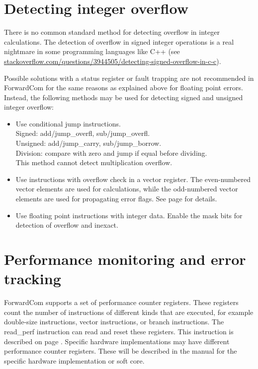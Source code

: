 \documentclass[forwardcom.tex]{subfiles}
\begin{document}
\section{Detecting integer overflow} 
\label{integerOverflowDetection}
There is no common standard method for detecting overflow in integer calculations. The detection of overflow in signed integer operations is a real nightmare in some programming languages like C++ (see 
\href{https://stackoverflow.com/questions/3944505/detecting-signed-overflow-in-c-c}{stackoverflow.com/questions/3944505/detecting-signed-overflow-in-c-c}).
\vv

Possible solutions with a status register or fault trapping are not recommended in ForwardCom for the same reasons as explained above for floating point errors. 
Instead, the following methods may be used for detecting signed and unsigned integer overflow: 

\begin{itemize}
  \item Use conditional jump instructions. \\
    Signed: add/jump\_overfl, sub/jump\_overfl. \\
    Unsigned: add/jump\_carry, sub/jump\_borrow. \\
    Division: compare with zero and jump if equal before dividing. \\
    This method cannot detect multiplication overflow.  
  
  \item Use instructions with overflow check in a vector register. 
    The even-numbered vector elements are used for calculations, while
    the odd-numbered vector elements are used for propagating error flags. 
    See page \pageref{table:addOcInstruction} for details. 
    
  \item Use floating point instructions with integer data. 
    Enable the mask bits for detection of overflow and inexact.
  
\end{itemize}
\vv


\section{Performance monitoring and error tracking}
ForwardCom supports a set of performance counter registers. These registers count the number of instructions of different kinds that are executed, for example double-size instructions, vector instructions, or branch instructions. The read\_perf instruction can read and reset these registers. This instruction is described on page \pageref{table:readPerfInstruction}. Specific hardware implementations may have different performance counter registers. These will be described in the manual for the specific hardware implementation or soft core.
\vv
\end{document}
